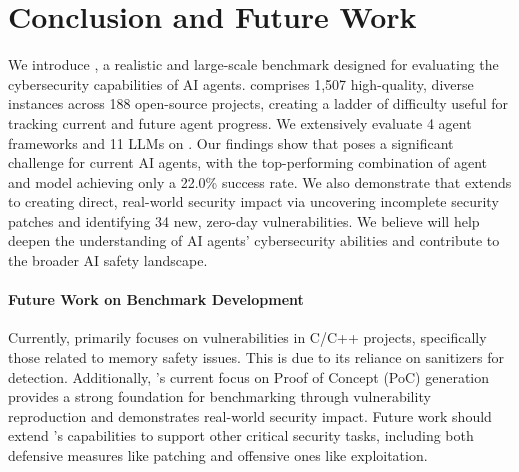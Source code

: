 \section{Conclusion and Future Work}
\label{sec:conclusion_limitations}


We introduce \sysname, a realistic and large-scale benchmark designed for evaluating the cybersecurity capabilities of AI agents.
\sysname comprises 1,507 high-quality, diverse instances across 188 open-source projects, creating a ladder of difficulty useful for tracking current and future agent progress.
We extensively evaluate 4 agent frameworks and 11 LLMs on \sysname.
Our findings show that \sysname poses a significant challenge for current AI agents, with the top-performing combination of agent and model achieving only a 22.0\% success rate.
We also demonstrate that \sysname extends to creating direct, real-world security impact via uncovering incomplete security patches and identifying 34 new, zero-day vulnerabilities.
We believe \sysname will help deepen the understanding of AI agents' cybersecurity abilities and contribute to the broader AI safety landscape.

\paragraph{Future Work on Benchmark Development}
Currently, \sysname primarily focuses on vulnerabilities in C/C++ projects, specifically those related to memory safety issues. This is due to its reliance on sanitizers for detection.
Additionally, \sysname's current focus on Proof of Concept (PoC) generation provides a strong foundation for benchmarking through vulnerability reproduction and demonstrates real-world security impact.
Future work should extend \sysname's capabilities to support other critical security tasks, including both defensive measures like patching and offensive ones like exploitation.


